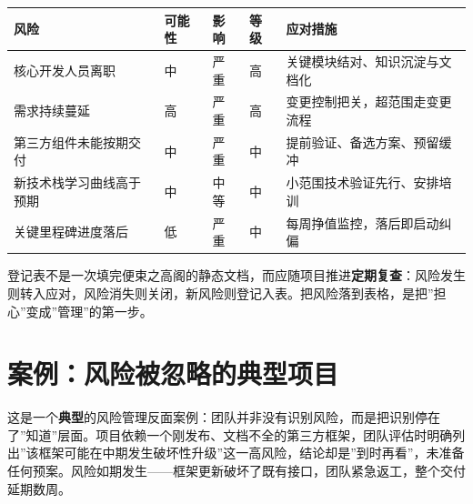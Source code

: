 \documentclass[12pt,a4paper,twoside,openany]{ctexbook}
\numberwithin{figure}{chapter}
\numberwithin{table}{chapter}
\newcounter{none}
\begin{document}
{\def\LTcaptype{none} %
\begin{longtable}[]{@{}
  >{\raggedright\arraybackslash}p{}
  >{\raggedright\arraybackslash}p{}
  >{\raggedright\arraybackslash}p{}
  >{\raggedright\arraybackslash}p{}
  >{\raggedright\arraybackslash}p{}@{}}
\toprule\noalign{}
\begin{minipage}[b]{\linewidth}\raggedright
风险
\end{minipage} & \begin{minipage}[b]{\linewidth}\raggedright
可能性
\end{minipage} & \begin{minipage}[b]{\linewidth}\raggedright
影响
\end{minipage} & \begin{minipage}[b]{\linewidth}\raggedright
等级
\end{minipage} & \begin{minipage}[b]{\linewidth}\raggedright
应对措施
\end{minipage} \\
\midrule\noalign{}
\endhead
\bottomrule\noalign{}
\endlastfoot
核心开发人员离职 & 中 & 严重 & 高 & 关键模块结对、知识沉淀与文档化 \\
需求持续蔓延 & 高 & 严重 & 高 & 变更控制把关，超范围走变更流程 \\
第三方组件未能按期交付 & 中 & 严重 & 中 &
提前验证、备选方案、预留缓冲 \\
新技术栈学习曲线高于预期 & 中 & 中等 & 中 &
小范围技术验证先行、安排培训 \\
关键里程碑进度落后 & 低 & 严重 & 中 & 每周挣值监控，落后即启动纠偏 \\
\end{longtable}
}

登记表不是一次填完便束之高阁的静态文档，而应随项目推进\textbf{定期复查}：风险发生则转入应对，风险消失则关闭，新风险则登记入表。把风险落到表格，是把''担心''变成''管理''的第一步。

\section{案例：风险被忽略的典型项目}\label{ux6848ux4f8bux98ceux9669ux88abux5ffdux7565ux7684ux5178ux578bux9879ux76ee}

这是一个\textbf{典型}的风险管理反面案例：团队并非没有识别风险，而是把识别停在了''知道''层面。项目依赖一个刚发布、文档不全的第三方框架，团队评估时明确列出''该框架可能在中期发生破坏性升级''这一高风险，结论却是''到时再看''，未准备任何预案。风险如期发生------框架更新破坏了既有接口，团队紧急返工，整个交付延期数周。
\end{document}
